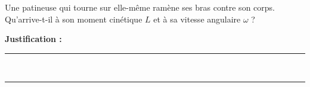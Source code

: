 Une patineuse qui tourne sur elle-même ramène ses bras contre son corps. Qu'arrive-t-il à son moment cinétique $L$ et à sa vitesse angulaire $\omega$ ?

\choices

\noindent\textbf{Justification :} \hrulefill \\[2.5ex]
\rule{\linewidth}{0.4pt} \\[2.5ex]
\rule{\linewidth}{0.4pt}
\vfill

